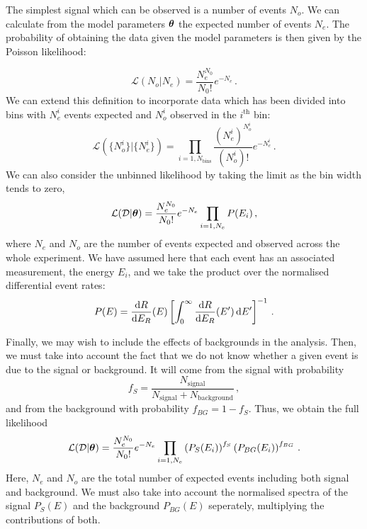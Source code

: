 The simplest signal which can be observed is a number of events $N_o$. We can calculate from the model parameters $\boldsymbol\theta$ the expected number of events $N_e$. The probability of obtaining the data given the model parameters is then given by the Poisson likelihood:

\begin{equation}
\mathcal{L}(N_o|N_e) = \frac{N_e^{N_0}}{N_0!}e^{-N_e}\,.
\end{equation}
We can extend this definition to incorporate data which has been divided into bins with $N_e^{i}$ events expected and $N_o^{i}$ observed in the $i^\textrm{th}$ bin:
\begin{equation}
\label{eq:ParamRecon:binnedL}
\mathcal{L}(\{N_o^{i}\}|\{N_e^{i}\}) = \prod_{i = 1,N_\textrm{bins}} \frac{(N_e^{i})^{N_o^{i}}}{(N_o^{i})!}e^{-N_e^{i}}\,.
\end{equation}
We can also consider the unbinned likelihood by taking the limit as the bin width tends to zero,
\begin{equation}
\label{eq:ParamRecon:unbinnedL}
\mathcal{L}(\mathcal{D}|\boldsymbol\theta) = \frac{N_e^{N_0}}{N_0!}e^{-N_e}\prod_{i = 1,N_e} P(E_i)\,,
\end{equation}
where $N_e$ and $N_o$ are the number of events expected and observed across the whole experiment. We have assumed here that each event has an associated measurement, the energy $E_i$, and we take the product over the normalised differential event rates:
\begin{equation}
P(E) = \frac{\mathrm{d}R}{\mathrm{d}E_R}(E)\left[\int_0^{\infty} \frac{\mathrm{d}R}{\mathrm{d}E_R}(E')\,\mathrm{d}E'\right]^{-1}\,.
\end{equation}

Finally, we may wish to include the effects of backgrounds in the analysis. Then, we must take into account the fact that we do not know whether a given event is due to the signal or background. It will come from the signal with probability
\begin{equation}
f_S = \frac{N_\textrm{signal}}{N_\textrm{signal} + N_\textrm{background}}\,,
\end{equation}
and from the background with probability $f_{BG} = 1-f_S$. Thus, we obtain the full likelihood
\begin{equation}
\mathcal{L}(\mathcal{D}|\boldsymbol\theta) = \frac{N_e^{N_0}}{N_0!}e^{-N_e}\prod_{i = 1,N_e} \left(P_S(E_i)\right)^{f_S}  \left(P_{BG}(E_i)\right)^{f_{BG}} \,.
\end{equation}
Here, $N_e$ and $N_o$ are the total number of expected events including both signal and background. We must also take into account the normalised spectra of the signal $P_S(E)$ and the background $P_{BG}(E)$ seperately, multiplying the contributions of both.

